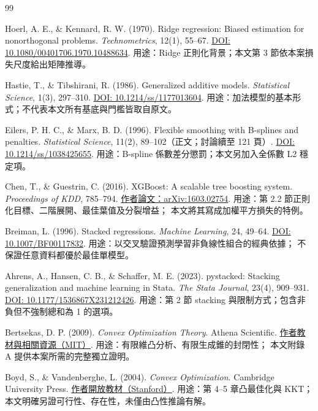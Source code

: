 \clearpage
\begin{thebibliography}{99}
\setlength{\itemsep}{5pt}

Hoerl, A. E., \& Kennard, R. W. (1970).
Ridge regression: Biased estimation for nonorthogonal problems.
\emph{Technometrics}, 12(1), 55--67.
\href{https://doi.org/10.1080/00401706.1970.10488634}{DOI: 10.1080/00401706.1970.10488634}.
用途：Ridge 正則化背景；本文第 3 節依本案損失尺度給出矩陣推導。

Hastie, T., \& Tibshirani, R. (1986).
Generalized additive models.
\emph{Statistical Science}, 1(3), 297--310.
\href{https://doi.org/10.1214/ss/1177013604}{DOI: 10.1214/ss/1177013604}.
用途：加法模型的基本形式；不代表本文所有基底與門檻皆取自原文。

Eilers, P. H. C., \& Marx, B. D. (1996).
Flexible smoothing with B-splines and penalties.
\emph{Statistical Science}, 11(2), 89--102（正文；討論續至 121 頁）.
\href{https://doi.org/10.1214/ss/1038425655}{DOI: 10.1214/ss/1038425655}.
用途：B-spline 係數差分懲罰；本文另加入全係數 L2 穩定項。

Chen, T., \& Guestrin, C. (2016).
XGBoost: A scalable tree boosting system.
\emph{Proceedings of KDD}, 785--794.
\href{https://arxiv.org/abs/1603.02754}{作者論文：arXiv:1603.02754}.
用途：第 2.2 節正則化目標、二階展開、最佳葉值及分裂增益；
本文將其寫成加權平方損失的特例。

Breiman, L. (1996).
Stacked regressions.
\emph{Machine Learning}, 24, 49--64.
\href{https://doi.org/10.1007/BF00117832}{DOI: 10.1007/BF00117832}.
用途：以交叉驗證預測學習非負線性組合的經典依據；
不保證任意資料都優於最佳單模型。

Ahrens, A., Hansen, C. B., \& Schaffer, M. E. (2023).
pystacked: Stacking generalization and machine learning in Stata.
\emph{The Stata Journal}, 23(4), 909--931.
\href{https://doi.org/10.1177/1536867X231212426}{DOI: 10.1177/1536867X231212426}.
用途：第 2 節 stacking 與限制方式；包含非負但不強制總和為 1 的選項。

Bertsekas, D. P. (2009).
\emph{Convex Optimization Theory}. Athena Scientific.
\href{https://web.mit.edu/dimitrib/www/convexduality.html}{作者教材與相關資源（MIT）}.
用途：有限維凸分析、有限生成錐的封閉性；
本文附錄 A 提供本案所需的完整獨立證明。

Boyd, S., \& Vandenberghe, L. (2004).
\emph{Convex Optimization}. Cambridge University Press.
\href{https://web.stanford.edu/~boyd/cvxbook/}{作者開放教材（Stanford）}.
用途：第 4--5 章凸最佳化與 KKT；
本文明確另證可行性、存在性，未僅由凸性推論有解。


\end{thebibliography}

